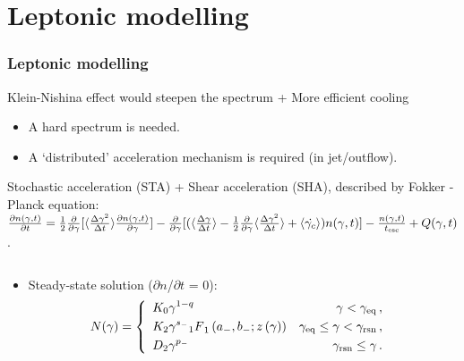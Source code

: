 \documentclass[10pt,aspectratio=169,mathserif]{beamer}
\begin{document}
\section{Leptonic modelling}
\begin{frame}
  \frametitle{Leptonic modelling}
	\begin{block}{Klein-Nishina effect would steepen the spectrum + More efficient cooling}
	    \begin{itemize}
	        \item A hard spectrum is needed.
             \item A `distributed' acceleration mechanism is required (in jet/outflow).
	    \end{itemize}
	  \end{block}
    Stochastic acceleration (STA) + Shear acceleration (SHA), described by Fokker - Planck equation:
	$\frac{\partial n(\gamma,t)}{\partial t}=\frac{1}{2}\frac{\partial}{\partial \gamma}[\langle \frac{\Delta \gamma^2}{\Delta t} \rangle \frac{\partial n(\gamma,t)}{\partial \gamma}]-\frac{\partial}{\partial \gamma}[(\langle \frac{\Delta \gamma}{\Delta t} \rangle-\frac{1}{2}\frac{\partial}{\partial \gamma}\langle \frac{\Delta \gamma^2}{\Delta t} \rangle+\left \langle \dot{\gamma_c} \right \rangle)n(\gamma,t)]-\frac{n(\gamma,t)}{t_{\rm esc}}+Q(\gamma,t)$.
 \begin{columns}
     \begin{column}{0.5\textwidth}
            \begin{itemize}
             \item Steady-state solution ($\partial n$/$\partial t$ = 0):\\
             \begin{equation*}
                N(\gamma)=
                \left \{
                \begin{array}{l@{\quad}l}
                \begin{aligned}
                &K_0\gamma^{1-q}&  \gamma<\gamma_{\rm eq}\,, \\
                &K_2\gamma^{s_-}{_1F}_1\left(a_-,b_-;z\left(\gamma\right)\right)& \gamma_{\rm eq}\le \gamma<\gamma_{\rm rsn}\,,\\
                &D_2\gamma^{p_{\rm -}} &\gamma_{\rm rsn}\leq\gamma\,.
                \label{e29}
                \end{aligned}
                \end{array}
                \right.
              \end{equation*}
           \end{itemize}
     \end{column}


\end{columns}
\end{frame}
\end{document}
